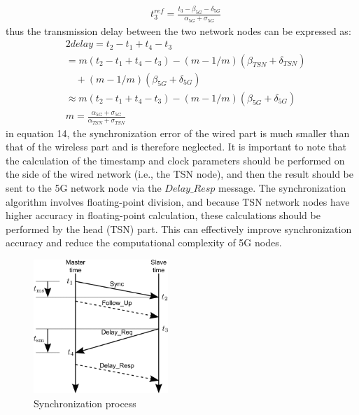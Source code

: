 \documentclass[english]{cccconf}
\begin{document}
{\begin{equation}
\begin{split}
		&t_3^{ref}=\frac{t_{3}-\beta_{5G}-\delta_{5G}}{\alpha_{5G}+\sigma_{5G}}
	\end{split}
\end{equation}
thus the transmission delay between the two network nodes can be expressed as:
\begin{equation}
	\begin{split}
		&2  delay =t_{2}-t_{1}+t_{4}-t_{3} \\
		&=m\left(t_{2}-t_{1}+t_{4}-t_{3}\right)-(m-1 / m)\left(\beta_{TSN}+\delta_{TSN}\right)\\
		&\quad+(m-1 / m)\left(\beta_{5G}+\delta_{5G}\right)\\
		& \approx m\left(t_{2}-t_{1}+t_{4}-t_{3}\right)-(m-1 / m)\left(\beta_{5G}+\delta_{5G}\right)\\
		&m=\frac{\alpha_{5G}+\sigma_{5G}}{\alpha_{TSN}+\sigma_{TSN}}		
	\end{split}
\end{equation}
in equation 14, the synchronization error of the wired part is much smaller than that of the wireless part and is therefore neglected. It is important to note that the calculation of the timestamp and clock parameters should be performed on the side of the wired network (i.e., the TSN node), and then the result should be sent to the 5G network node via the $Delay\_Resp$ message. The synchronization algorithm involves floating-point division, and because TSN network nodes have higher accuracy in floating-point calculation, these calculations should be performed by the head (TSN) part. This can effectively improve synchronization accuracy and reduce the computational complexity of 5G nodes.

\begin{figure}[htbp]
	\centering
	\setcounter{figure}{5}
	\includegraphics[width=2in]{fig10.png}
	\caption{Synchronization process}
\end{figure}
}
\end{document}
